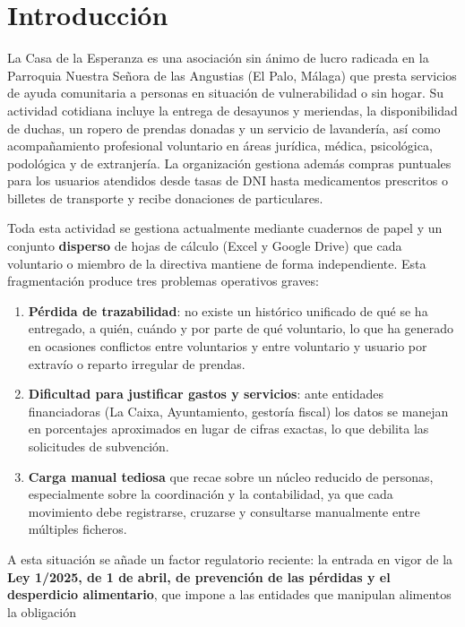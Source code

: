\section{Introducción}
La Casa de la Esperanza es una asociación sin ánimo de lucro radicada en la Parroquia Nuestra Señora de las Angustias 
(El Palo, Málaga) que presta servicios de ayuda comunitaria a personas en situación de vulnerabilidad o sin hogar. 
Su actividad cotidiana incluye la entrega de desayunos y meriendas, la disponibilidad de duchas, un ropero de prendas 
donadas y un servicio de lavandería, así como acompañamiento profesional voluntario en áreas jurídica, médica, psicológica, 
podológica y de extranjería. La organización gestiona además compras puntuales para los usuarios atendidos desde tasas de 
DNI hasta medicamentos prescritos o billetes de transporte y recibe donaciones de particulares.
\par
\vspace{5mm}
Toda esta actividad se gestiona actualmente mediante cuadernos de papel y un conjunto \textbf{disperso} de hojas de cálculo 
(Excel y Google Drive) que cada voluntario o miembro de la directiva mantiene de forma independiente. Esta fragmentación 
produce tres problemas operativos graves:
\begin{enumerate}
    \item \textbf{Pérdida de trazabilidad}: no existe un histórico unificado de qué se ha
    entregado, a quién, cuándo y por parte de qué voluntario, lo que ha generado en
    ocasiones conflictos entre voluntarios y entre voluntario y usuario por extravío
    o reparto irregular de prendas.  
    \item \textbf{Dificultad para justificar gastos y servicios}: ante entidades financiadoras (La Caixa, Ayuntamiento,
    gestoría fiscal) los datos se manejan en porcentajes aproximados en lugar de
    cifras exactas, lo que debilita las solicitudes de subvención.
    \item \textbf{Carga manual tediosa} que recae sobre un núcleo reducido de personas,
    especialmente sobre la coordinación y la contabilidad, ya que cada movimiento
    debe registrarse, cruzarse y consultarse manualmente entre múltiples ficheros.
\end{enumerate}
\par
\vspace{5mm}
A esta situación se añade un factor regulatorio reciente: la entrada en vigor de
la \textbf{Ley 1/2025, de 1 de abril, de prevención de las pérdidas y el desperdicio
alimentario}, que impone a las entidades que manipulan alimentos la obligación
